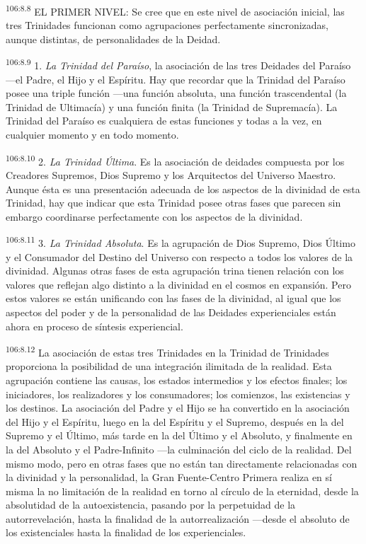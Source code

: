\documentclass[twoside, 11pt]{book}
\begin{document}
\par
\textsuperscript{106:8.8} EL PRIMER NIVEL: Se cree que en este nivel de asociación inicial, las tres Trinidades funcionan como agrupaciones perfectamente sincronizadas, aunque distintas, de personalidades de la Deidad.

\par
\textsuperscript{106:8.9} 1. \textit{La Trinidad del Paraíso}, la asociación de las tres Deidades del Paraíso ---el Padre, el Hijo y el Espíritu. Hay que recordar que la Trinidad del Paraíso posee una triple función ---una función absoluta, una función trascendental (la Trinidad de Ultimacía) y una función finita (la Trinidad de Supremacía). La Trinidad del Paraíso es cualquiera de estas funciones y todas a la vez, en cualquier momento y en todo momento.

\par
\textsuperscript{106:8.10} 2. \textit{La Trinidad Última}. Es la asociación de deidades compuesta por los Creadores Supremos, Dios Supremo y los Arquitectos del Universo Maestro. Aunque ésta es una presentación adecuada de los aspectos de la divinidad de esta Trinidad, hay que indicar que esta Trinidad posee otras fases que parecen sin embargo coordinarse perfectamente con los aspectos de la divinidad.

\par
\textsuperscript{106:8.11} 3. \textit{La Trinidad Absoluta}. Es la agrupación de Dios Supremo, Dios Último y el Consumador del Destino del Universo con respecto a todos los valores de la divinidad. Algunas otras fases de esta agrupación trina tienen relación con los valores que reflejan algo distinto a la divinidad en el cosmos en expansión. Pero estos valores se están unificando con las fases de la divinidad, al igual que los aspectos del poder y de la personalidad de las Deidades experienciales están ahora en proceso de síntesis experiencial.

\par
\textsuperscript{106:8.12} La asociación de estas tres Trinidades en la Trinidad de Trinidades proporciona la posibilidad de una integración ilimitada de la realidad. Esta agrupación contiene las causas, los estados intermedios y los efectos finales; los iniciadores, los realizadores y los consumadores; los comienzos, las existencias y los destinos. La asociación del Padre y el Hijo se ha convertido en la asociación del Hijo y el Espíritu, luego en la del Espíritu y el Supremo, después en la del Supremo y el Último, más tarde en la del Último y el Absoluto, y finalmente en la del Absoluto y el Padre-Infinito ---la culminación del ciclo de la realidad. Del mismo modo, pero en otras fases que no están tan directamente relacionadas con la divinidad y la personalidad, la Gran Fuente-Centro Primera realiza en sí misma la no limitación de la realidad en torno al círculo de la eternidad, desde la absolutidad de la autoexistencia, pasando por la perpetuidad de la autorrevelación, hasta la finalidad de la autorrealización ---desde el absoluto de los existenciales hasta la finalidad de los experienciales.
\end{document}

